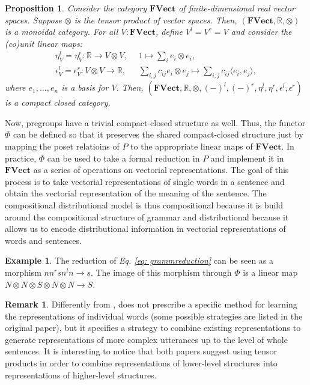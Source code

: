 \documentclass[11pt,a4paper,openright,twoside]{report}
\newcounter{mycounter}
\theoremstyle{plain}
\newtheorem{proposition}[mycounter]{Proposition}
\theoremstyle{definition}
\newtheorem{remark}[mycounter]{Remark}
\newtheorem{example}[mycounter]{Example}
\begin{document}
\begin{proposition}
  Consider the category $\mathbf{FVect}$ of finite-dimensional real vector spaces. Suppose $\otimes$ is the tensor product of vector spaces. Then, $(\mathbf{FVect}, \mathbb{R}, \otimes)$ is a monoidal category.  
  For all $V: \mathbf{FVect}$, define $V^l = V^r = V$ and consider the (co)unit linear maps:
  \begin{align*}
    \eta_V^l = \eta_V^r: \mathbb{R} \to V \otimes V, \,\,\, &1 \mapsto \sum_i e_i \otimes e_i,\\
    \epsilon_V^l = \epsilon_V^r: V \otimes V \to \mathbb{R}, \,\,\, &\sum_{i,j} c_{ij} e_i \otimes e_j \mapsto \sum_{i,j} c_{ij} \langle e_i, e_j \rangle,
  \end{align*}
  where $e_1, \dots, e_n$ is a basis for $V$. Then, $(\mathbf{FVect}, \mathbb{R}, \otimes, (-)^l, (-)^r, \eta^l, \eta^r, \epsilon^l, \epsilon^r)$ is a compact closed category.
\end{proposition}

Now, pregroups have a trivial compact-closed structure as well. Thus, the functor $\Phi$ can be defined so that it preserves the shared compact-closed structure just by mapping the poset relatioins of $P$ to the appropriate linear maps of $\mathbf{FVect}$. In practice, $\Phi$ can be used to take a formal reduction in $P$ and implement it in $\mathbf{FVect}$ as a series of operations on vectorial representations. The goal of this process is to take vectorial representations of single words in a sentence and obtain the vectorial representation of the meaning of the sentence. The compositional distributional model is thus compositional because it is build around the compositional structure of grammar and distributional because it allows us to encode distributional information in vectorial representations of words and sentences.

\begin{example}
  The reduction of \textit{Eq. \ref{eq: grammreduction}} can be seen as a morphism $nn^rsn^ln \to s$. The image of this morphism through $\Phi$ is a linear map 
  $N \otimes N \otimes S \otimes N \otimes N \to S.$
\end{example}

\begin{remark}
  Differently from \cite{sheshmani2021categorical}, \cite{coecke2010mathematical} does not prescribe a specific method for learning the representations of individual words (some possible strategies are listed in the original paper), but it specifies a strategy to combine existing representations to generate representations of more complex utterances up to the level of whole sentences. It is interesting to notice that both papers suggest using tensor products in order to combine representations of lower-level structures into representations of higher-level structures.
\end{remark}
\end{document}
